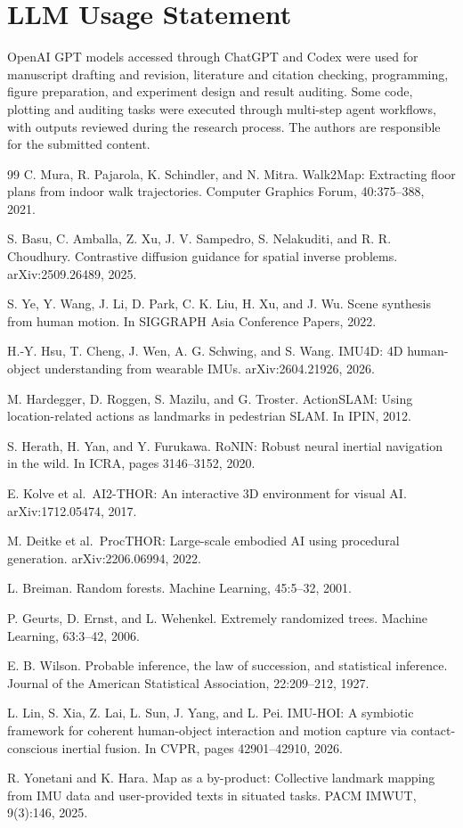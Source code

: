\documentclass[10pt,twocolumn,letterpaper]{article}
\begin{document}
\section*{LLM Usage Statement}
OpenAI GPT models accessed through ChatGPT and Codex were used for
manuscript drafting and revision, literature and citation checking,
programming, figure preparation, and experiment design and result
auditing. Some code, plotting and auditing tasks were executed through
multi-step agent workflows, with outputs reviewed during the research
process. The authors are responsible for the submitted content.
{\small
\begin{thebibliography}{99}
 C. Mura, R. Pajarola, K. Schindler, and N. Mitra. Walk2Map: Extracting
floor plans from indoor walk trajectories. Computer Graphics Forum,
40:375--388, 2021.

 S. Basu, C. Amballa, Z. Xu, J. V. Sampedro, S. Nelakuditi, and R. R.
Choudhury. Contrastive diffusion guidance for spatial inverse problems.
arXiv:2509.26489, 2025.

 S. Ye, Y. Wang, J. Li, D. Park, C. K. Liu, H. Xu, and J. Wu. Scene
synthesis from human motion. In SIGGRAPH Asia Conference Papers, 2022.

 H.-Y. Hsu, T. Cheng, J. Wen, A. G. Schwing, and S. Wang. IMU4D: 4D
human-object understanding from wearable IMUs. arXiv:2604.21926, 2026.

 M. Hardegger, D. Roggen, S. Mazilu, and G. Troster. ActionSLAM: Using
location-related actions as landmarks in pedestrian SLAM. In IPIN, 2012.

 S. Herath, H. Yan, and Y. Furukawa. RoNIN: Robust neural inertial
navigation in the wild. In ICRA, pages 3146--3152, 2020.

 E. Kolve et al.~AI2-THOR: An interactive 3D environment for visual AI.
arXiv:1712.05474, 2017.

 M. Deitke et al.~ProcTHOR: Large-scale embodied AI using procedural
generation. arXiv:2206.06994, 2022.

 L. Breiman. Random forests. Machine Learning, 45:5--32, 2001.

 P. Geurts, D. Ernst, and L. Wehenkel. Extremely randomized trees.
Machine Learning, 63:3--42, 2006.

 E. B. Wilson. Probable inference, the law of succession, and statistical
inference. Journal of the American Statistical Association, 22:209--212,
1927.

 L. Lin, S. Xia, Z. Lai, L. Sun, J. Yang, and L. Pei. IMU-HOI: A
symbiotic framework for coherent human-object interaction and motion
capture via contact-conscious inertial fusion. In CVPR, pages
42901--42910, 2026.

 R. Yonetani and K. Hara. Map as a by-product: Collective landmark
mapping from IMU data and user-provided texts in situated tasks. PACM
IMWUT, 9(3):146, 2025.
\end{thebibliography}
}
\end{document}
